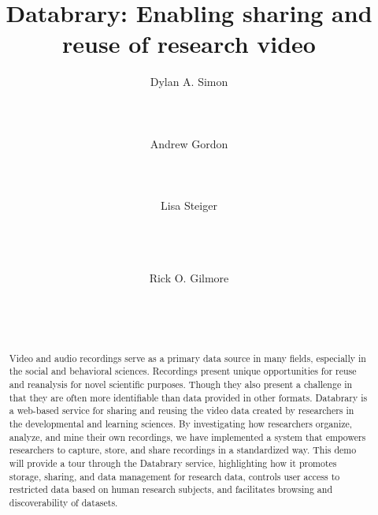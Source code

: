 \documentclass{sig-alternate}
\begin{document}

\title{Databrary: Enabling sharing and reuse of research video}


\author{
\alignauthor
Dylan A. Simon\\
	\\
	\\
	\\
\alignauthor
Andrew Gordon\\
	\\
	\\
	\\
\alignauthor
Lisa Steiger\\
	\\
	\\
	\\
\and
Rick O. Gilmore\\
	\\
	\\
	\\
}

\maketitle

\begin{abstract}
Video and audio recordings serve as a primary data source in many fields, especially in the social and behavioral sciences.
Recordings present unique opportunities for reuse and reanalysis for novel scientific purposes. Though they also present a challenge in that they are often more identifiable than data provided in other formats.
Databrary is a web-based service for sharing and reusing the video data created by researchers in the developmental and learning sciences.
By investigating how researchers organize, analyze, and mine their own recordings, we have implemented a system that empowers researchers to capture, store, and share recordings in a standardized way.
This demo will provide a tour through the Databrary service, highlighting how it promotes storage, sharing, and data management for research data, controls user access to restricted data based on human research subjects, and facilitates browsing and discoverability of datasets.
\end{abstract}
\end{document}
